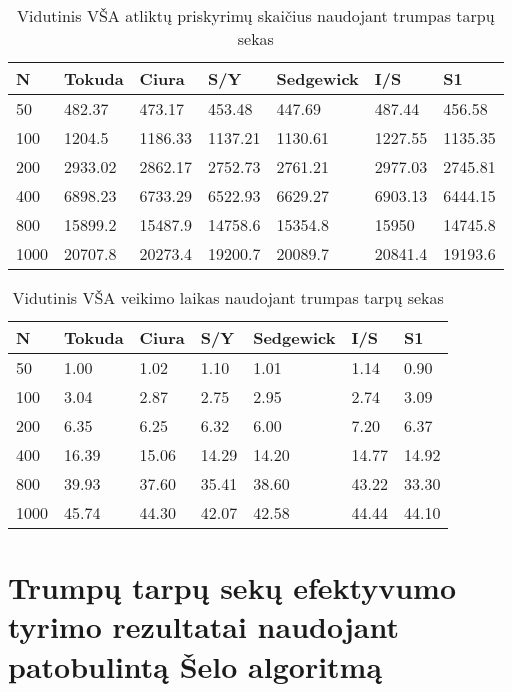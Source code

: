 \documentclass{VUMIFInfKursinis}
\begin{document}
\begin{table}[H]
  \caption{Vidutinis VŠA atliktų priskyrimų skaičius naudojant trumpas tarpų sekas}
  \label{tss_small_assignments}
  \begin{tabular}{|l|l|l|l|l|l|l|}
  \hline
  N    & Tokuda  & Ciura   & S/Y     & Sedgewick & I/S     & S1      \\ \hline
  50   & 482.37  & 473.17  & 453.48  & 447.69    & 487.44  & 456.58  \\ \hline
  100  & 1204.5  & 1186.33 & 1137.21 & 1130.61   & 1227.55 & 1135.35 \\ \hline
  200  & 2933.02 & 2862.17 & 2752.73 & 2761.21   & 2977.03 & 2745.81 \\ \hline
  400  & 6898.23 & 6733.29 & 6522.93 & 6629.27   & 6903.13 & 6444.15 \\ \hline
  800  & 15899.2 & 15487.9 & 14758.6 & 15354.8   & 15950   & 14745.8 \\ \hline
  1000 & 20707.8 & 20273.4 & 19200.7 & 20089.7   & 20841.4 & 19193.6 \\ \hline
  \end{tabular}
  \end{table}

\begin{table}[H]
  \caption{Vidutinis VŠA veikimo laikas naudojant trumpas tarpų sekas}
  \label{tss_small_runtimes}
  \begin{tabular}{|l|l|l|l|l|l|l|}
  \hline
  N    & Tokuda & Ciura & S/Y   & Sedgewick & I/S   & S1    \\ \hline
  50   & 1.00   & 1.02  & 1.10  & 1.01      & 1.14  & 0.90  \\ \hline
  100  & 3.04   & 2.87  & 2.75  & 2.95      & 2.74  & 3.09  \\ \hline
  200  & 6.35   & 6.25  & 6.32  & 6.00      & 7.20  & 6.37  \\ \hline
  400  & 16.39  & 15.06 & 14.29 & 14.20     & 14.77 & 14.92 \\ \hline
  800  & 39.93  & 37.60 & 35.41 & 38.60     & 43.22 & 33.30 \\ \hline
  1000 & 45.74  & 44.30 & 42.07 & 42.58     & 44.44 & 44.10 \\ \hline
  \end{tabular}
  \end{table}

\section{Trumpų tarpų sekų efektyvumo tyrimo rezultatai naudojant patobulintą Šelo algoritmą}
\end{document}
